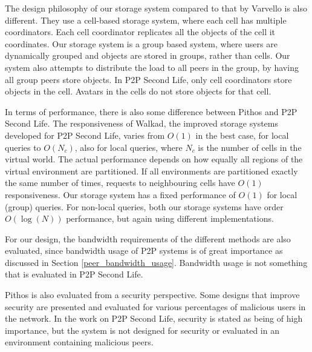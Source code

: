 The design philosophy of our storage system compared to that by Varvello is also different. They use a cell-based storage system, where each cell has multiple coordinators. Each cell coordinator replicates all the objects of the cell it coordinates. Our storage system is a group based system, where users are dynamically grouped and objects are stored in groups, rather than cells. Our system also attempts to distribute the load to all peers in the group, by having all group peers store objects. In P2P Second Life, only cell coordinators store objects in the cell. Avatars in the cells do not store objects for that cell.

In terms of performance, there is also some difference between Pithos and P2P Second Life. The responsiveness of Walkad, the improved storage systems developed for P2P Second Life, varies from $O(1)$ in the best case, for local queries to $O(N_c)$, also for local queries, where $N_c$ is the number of cells in the virtual world. The actual performance depends on how equally all regions of the virtual environment are partitioned. If all environments are partitioned exactly the same number of times, requests to neighbouring cells have $O(1)$ responsiveness. Our storage system has a fixed performance of $O(1)$ for local (group) queries. For non-local queries, both our storage systems have order $O(\log (N))$ performance, but again using different implementations.

For our design, the bandwidth requirements of the different methods are also evaluated, since bandwidth usage of P2P systems is of great importance as discussed in Section \ref{peer_bandwidth_usage}. Bandwidth usage is not something that is evaluated in P2P Second Life.

Pithos is also evaluated from a security perspective. Some designs that improve security are presented and evaluated for various percentages of malicious users in the network. In the work on P2P Second Life, security is stated as being of high importance, but the system is not designed for security or evaluated in an environment containing malicious peers.


